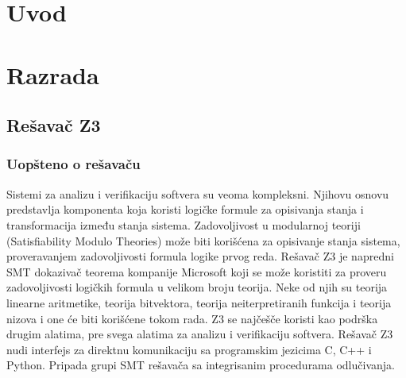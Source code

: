 \documentclass[12pt,oneside]{memoir}
\begin{document}
\frontmatter
\naslovna
\komisija
\apstrakt
\tableofcontents*

\mainmatter

\chapter{Uvod}


\chapter{Razrada}
\label{chp:razrada}
\section{Rešavač Z3}

\subsection{Uopšteno o rešavaču}
Sistemi za analizu i verifikaciju softvera su veoma kompleksni. Njihovu osnovu predstavlja komponenta koja koristi logičke formule za opisivanja stanja i transformacija između stanja sistema. Zadovoljivost u modularnoj teoriji (Satisfiability Modulo Theories) može biti korišćena za opisivanje stanja sistema, proveravanjem zadovoljivosti formula logike prvog reda. Rešavač Z3 je napredni SMT dokazivač teorema kompanije Microsoft koji se može koristiti za proveru zadovoljivosti logičkih formula u velikom broju teorija. Neke od njih su teorija linearne aritmetike, teorija bitvektora, teorija neiterpretiranih funkcija i teorija nizova i one će biti korišćene tokom rada. Z3 se najčešče koristi kao podrška drugim alatima, pre svega alatima za analizu i verifikaciju softvera. Rešavač Z3 nudi interfejs za direktnu komunikaciju sa programskim jezicima C, C++ i Python. Pripada grupi SMT rešavača sa integrisanim procedurama odlučivanja.
\\
\end{document}
